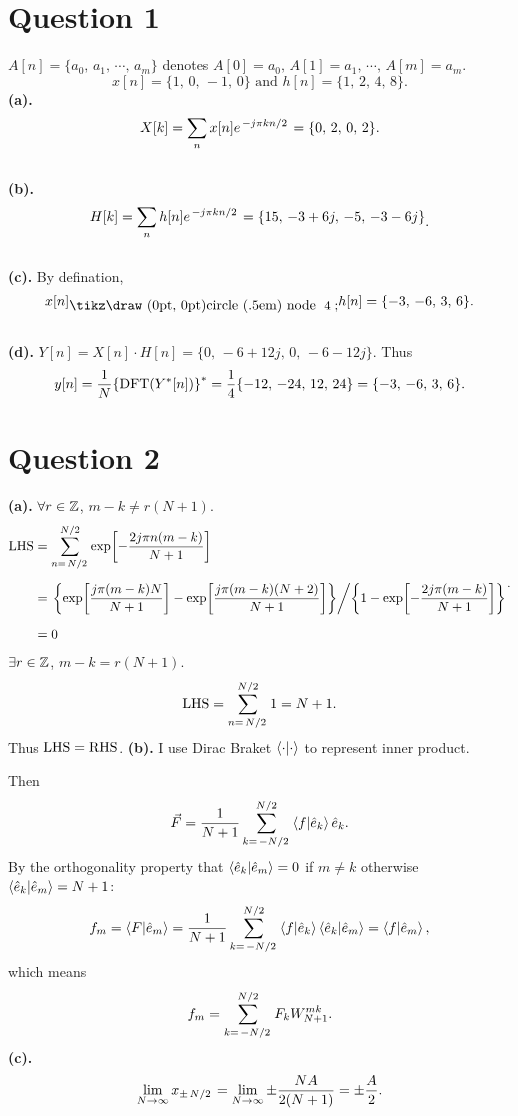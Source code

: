 \documentclass{article}
\newcommand*{\circled}[1]{\lower.7ex\hbox{\tikz\draw (0pt, 0pt)circle (.5em) node {\makebox[1em][c]{\small #1}};}}
\begin{document}

\section*{Question 1}
$A[n]=\{a_0,\,a_1,\,\cdots,\,a_m\}$ denotes $A[0]=a_0,\,A[1]=a_1,\,\cdots,\,A[m]=a_{m}$.
\[
	x[n]=\{1,\,0,\,-1,\,0\}\text{ and  }h[n]=\{1,\,2,\,4,\,8\}
	.\]
\textbf{(a).}
\[
	X[k]=\sum_nx[n]e^{\flatfrac{-j\pi kn}{2}}=\{0,\,2,\,0,\,2\}
	.\]
\\
\textbf{(b).}
\[
	\begin{aligned}
		H[k]
		=\sum_nh[n]e^{\flatfrac{-j\pi kn}{2}}
		=\{15,\,-3+6j,\,-5,\,-3-6j\}
	\end{aligned}
	.\]
\\
\textbf{(c).} By defination,
\[
	x[n]\circled{4}h[n]
	=
	\{-3,\,-6,\,3,\,6\}
	.\]
\\
\textbf{(d).}
$Y[n]=X[n]\cdot H[n]=\{0,\,-6+12j,\,0,\,-6-12j\}$. Thus
\[
	y[n]
	=
	\frac{1}{N}\qty{\mathrm{DFT}\qty(Y^*[n])}^*
	=
	\frac{1}{4}\{-12,\,-24,\,12,\,24\}
	=
	\{-3,\,-6,\,3,\,6\}
	.\]
\section*{Question 2}
\textbf{(a).}
$\forall r\in\mathbb{Z}$, $m-k\ne r(N+1)$.
\[
	\begin{aligned}
		\LHS
		 & =
		\sum_{n=\flatfrac{N}{2}}^{\flatfrac{N}{2}}\exp[-\frac{2j\pi n(m-k)}{N+1}]
		\\[6pt]&=
		\flatfrac
		{\qty{\exp[\frac{j\pi(m-k)N}{N+1}]-\exp[\frac{j\pi(m-k)(N+2)}{N+1}]}}
		{\qty{1-\exp[-\frac{2j\pi(m-k)}{N+1}]}}
		\\[6pt]&=0
	\end{aligned}
	.\]
$\exists r\in\mathbb{Z}$, $m-k=r(N+1)$.
\[
	\LHS
	=
	\sum_{n=\flatfrac{N}{2}}^{\flatfrac{N}{2}}1
	=N+1
	.\]
Thus $\text{LHS}=\text{RHS}$.
\newpage
\textbf{(b).}
I use Dirac Braket $\braket{\cdot}{\cdot}$ to represent inner product.

Then \[\vec{F}=\frac{1}{N+1}\sum_{k=\flatfrac{-N}{2}}^{\flatfrac{N}{2}}\braket{f}{\hat{e}_k}\hat{e}_k.\]
By the orthogonality property that $\braket{\hat{e}_k}{\hat{e}_m}=0$ if $m\ne k$ otherwise $\braket{\hat{e}_k}{\hat{e}_m}=N+1$:
\[
	f_m
	=
	\braket{F}{\hat{e}_m}
	=
	\frac{1}{N+1}
	\sum_{k=\flatfrac{-N}{2}}^{\flatfrac{N}{2}}
	\braket{f}{\hat{e}_k}
	\braket{\hat{e}_k}{\hat{e}_m}
	=
	\braket{f}{\hat{e}_m}
	,\] which means
\[
	f_m=\sum_{k=\flatfrac{-N}{2}}^{\flatfrac{N}{2}}F_kW_{N+1}^{mk}
	.\]
\textbf{(c).}
\[
	\lim_{N\to\infty} x_{\pm\flatfrac{N}{2}}=\lim_{N\to\infty}\pm\frac{NA}{2(N+1)}=\pm \frac{A}{2}
	.\]
\end{document}
